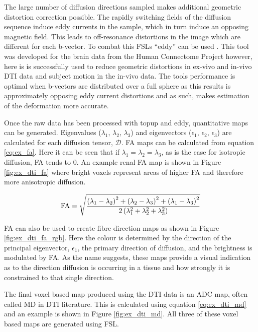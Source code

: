 The large number of diffusion directions sampled makes additional geometric distortion correction possible. The rapidly switching fields of the diffusion sequence induce eddy currents in the sample, which in turn induce an opposing magnetic field. This leads to off-resonance distortions in the image which are different for each b-vector. To combat this \ac{FSL}s ``eddy'' can be used \cite{andersson_integrated_2016}. This tool was developed for the brain data from the Human Connectome Project \cite{andersson_non-parametric_2015} however, here is is successfully used to reduce geometric distortions in ex-vivo and in-vivo \ac{DTI} data and subject motion in the in-vivo data. The tools performance is optimal when b-vectors are distributed over a full sphere as this results is approximately opposing eddy current distortions and as such, makes estimation of the deformation more accurate.

Once the raw data has been processed with topup and eddy, quantitative maps can be generated. Eigenvalues ($\lambda_1$, $\lambda_2$, $\lambda_3$) and eigenvectors ($\epsilon_1$, $\epsilon_2$, $\epsilon_3$) are calculated for each diffusion tensor, $\mathscr{D}$. \ac{FA} maps can be calculated from equation \eqref{eq:ex_fa}. Here it can be seen that if $\lambda_1 = \lambda_2 = \lambda_3$, as is the case for isotropic diffusion, \ac{FA} tends to 0. An example renal \ac{FA} map is shown in Figure \ref{fig:ex_dti_fa} where bright voxels represent areas of higher \ac{FA} and therefore more anisotropic diffusion.

\begin{equation}
	\textup{FA} = \sqrt{\frac{\left(\lambda_1 - \lambda_2\right)^2 + \left(\lambda_2 - \lambda_3\right)^2 + \left(\lambda_1 - \lambda_3\right)^2}{2\left( \lambda_1^2 + \lambda_2^2 + \lambda_3^2\right)}}
		\label{eq:ex_fa}
\end{equation}

\ac{FA} can also be used to create fibre direction maps as shown in Figure \ref{fig:ex_dti_fa_rgb}. Here the colour is determined by the direction of the principal eigenvector, $\epsilon_1$, the primary direction of diffusion, and the brightness is modulated by \ac{FA}. As the name suggests, these maps provide a visual indication as to the direction diffusion is occurring in a tissue and how strongly it is constrained to that single direction.

The final voxel based map produced using the \ac{DTI} data is an \ac{ADC} map, often called \ac{MD} in \ac{DTI} literature. This is calculated using equation \eqref{eq:ex_dti_md} and an example is shown in Figure \ref{fig:ex_dti_md}. All three of these voxel based maps are generated using \ac{FSL}.

